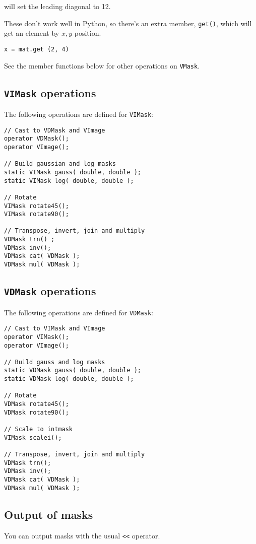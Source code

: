 \noindent
will set the leading diagonal to 12.

These don't work well in Python, so there's an extra member, \verb+get()+,
which will get an element by $x,y$ position.

\begin{verbatim}
x = mat.get (2, 4)
\end{verbatim}

See the member functions below for other operations on \verb+VMask+.

\subsection{\texttt{VIMask} operations}

The following operations are defined for \verb+VIMask+:

\begin{verbatim}
// Cast to VDMask and VImage
operator VDMask();
operator VImage();

// Build gaussian and log masks
static VIMask gauss( double, double );
static VIMask log( double, double );

// Rotate
VIMask rotate45();
VIMask rotate90();

// Transpose, invert, join and multiply
VDMask trn() ;
VDMask inv();
VDMask cat( VDMask );
VDMask mul( VDMask );
\end{verbatim}

\subsection{\texttt{VDMask} operations}

The following operations are defined for \verb+VDMask+:

\begin{verbatim}
// Cast to VIMask and VImage
operator VIMask();
operator VImage();

// Build gauss and log masks
static VDMask gauss( double, double );
static VDMask log( double, double );

// Rotate
VDMask rotate45();
VDMask rotate90(); 

// Scale to intmask
VIMask scalei();

// Transpose, invert, join and multiply
VDMask trn();
VDMask inv();
VDMask cat( VDMask );
VDMask mul( VDMask );
\end{verbatim}

\subsection{Output of masks}

You can output masks with the usual \verb+<<+ operator.
